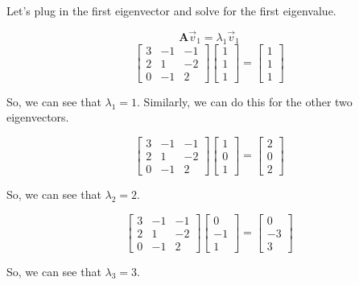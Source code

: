 \begin{enumerate}
{    Let's plug in the first eigenvector and solve for the first eigenvalue.
    
    $$\mathbf{A}\vec{v}_1 = \lambda_1\vec{v}_1$$
    $$
	\begin{bmatrix} 3 & -1 & -1\\ 
	               2 & 1 & -2\\
	               0 & -1 & 2
	\end{bmatrix} \begin{bmatrix} 1 \\ 1 \\1 \end{bmatrix} =\begin{bmatrix} 1 \\ 1 \\1 \end{bmatrix}
	$$
	
	So, we can see that $\lambda_1 = 1$. Similarly, we can do this for the other two eigenvectors.
	
	 $$
	\begin{bmatrix} 3 & -1 & -1\\ 
	               2 & 1 & -2\\
	               0 & -1 & 2
	\end{bmatrix} \begin{bmatrix} 1 \\ 0 \\1 \end{bmatrix} =\begin{bmatrix} 2 \\ 0 \\2 \end{bmatrix}
	$$
	
	So, we can see that $\lambda_2 = 2$.
	
	$$
	\begin{bmatrix} 3 & -1 & -1\\ 
	               2 & 1 & -2\\
	               0 & -1 & 2
	\end{bmatrix} \begin{bmatrix} 0 \\ -1 \\1 \end{bmatrix} =\begin{bmatrix} 0 \\ -3 \\3 \end{bmatrix}
	$$
	
	So, we can see that $\lambda_3 = 3$.

}

\end{enumerate}
